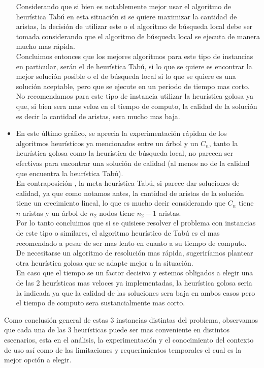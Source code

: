 \begin{itemize}
Considerando que si bien es notablemente mejor usar el algoritmo de heurística Tabú en esta situación si se quiere maximizar la cantidad de aristas, la decisión de utilizar este o el algoritmo de búsqueda local debe ser tomada considerando que el algoritmo de búsqueda local se ejecuta de manera mucho mas rápida.\\
Concluimos entonces que los mejores algoritmos para este tipo de instancias en particular, serán el de heurística Tabú, si lo que se quiere es encontrar la mejor solución posible o el de búsqueda local si lo que se quiere es una solución aceptable, pero que se ejecute en un periodo de tiempo mas corto.\\
No recomendamos para este tipo de instancia utilizar la heurística golosa ya que, si bien sera mas veloz en el tiempo de computo, la calidad de la solución es decir la cantidad de aristas, sera mucho mas baja.
\item En este último gráfico, se aprecia la experimentación rápidan de los algoritmos heurísticos ya mencionados entre un árbol y un $C_n$, tanto la heurística golosa como la heurística de búsqueda local, no parecen ser efectivas para encontrar una solución de calidad (al menos no de la calidad que encuentra la heurística Tabú).\\
En contraposición , la meta-heurística Tabú, si parece dar soluciones de calidad, ya que como notamos antes, la cantidad de aristas de la solución tiene un crecimiento lineal, lo que es mucho decir considerando que $C_n$ tiene $n$ aristas y un árbol de $n_2$ nodos tiene $n_2-1$ aristas.\\
Por lo tanto concluimos que si se quisiese resolver el problema con instancias de este tipo o similares, el algoritmo heurístico de Tabú es el mas recomendado a pesar de ser mas lento en cuanto a su tiempo de computo.\\
De necesitarse un algoritmo de resolución mas rápida, sugeriríamos plantear otra heurística golosa que se adapte mejor a la situación.\\
En caso que el tiempo se un factor decisivo y estemos obligados a elegir una de las 2 heurísticas mas veloces ya implementadas, la heurística golosa seria la indicada ya que la calidad de las soluciones sera baja en ambos casos pero el tiempo de computo sera sustancialmente mas corto.

\end{itemize}
Como conclusión general de  estas 3 instancias distintas del problema, observamos que cada una de las 3 heurísticas puede ser mas conveniente en distintos escenarios, esta en el análisis, la experimentación y el conocimiento del contexto de uso así como de las limitaciones y requerimientos temporales el cual es la mejor opción a elegir.